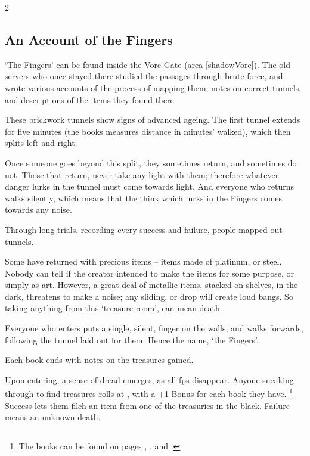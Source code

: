 \begin{multicols}{2}

\subsection{An Account of the Fingers}
\label{bookOfFingers}

`The Fingers' can be found inside the Vore Gate (area \vref{shadowVore}).
The old \glspl{server} who once stayed there studied the passages through brute-force, and wrote various accounts of the process of mapping them, notes on correct tunnels, and descriptions of the items they found there.

\begin{exampletext}
  These brickwork tunnels show signs of advanced ageing.
  The first tunnel extends for five minutes (the books measures distance in minutes' walked), which then splits left and right.

  Once someone goes beyond this split, they sometimes return, and sometimes do not.
  Those that return, never take any light with them; therefore whatever danger lurks in the tunnel must come towards light.
  And everyone who returns walks silently, which means that the think which lurks in the Fingers comes towards any noise.

  Through long trials, recording every success and failure, people mapped out tunnels.

  Some have returned with precious items -- items made of platinum, or steel.
  Nobody can tell if the creator intended to make the items for some purpose, or simply as art.
  However, a great deal of metallic items, stacked on shelves, in the dark, threatens to make a noise; any sliding, or drop will create loud bangs.
  So taking anything from this `treasure room', can mean death.

  Everyone who enters puts a single, silent, finger on the walls, and walks forwards, following the tunnel laid out for them.
  Hence the name, `the Fingers'.
\end{exampletext}

Each book ends with notes on the treasures gained.

Upon entering, a sense of dread emerges, as all \glspl{fp} disappear.
Anyone sneaking through to find treasures rolls  at \tn[12], with a +1 Bonus for each book they have.%
\footnote{The books can be found on pages \pageref{fingers:basement}, \pageref{fingers:tower}, and \pageref{fingers:greyLibrary}.}
Success lets them filch an item from one of the treasuries in the black.
Failure means an unknown death.


\end{multicols}
